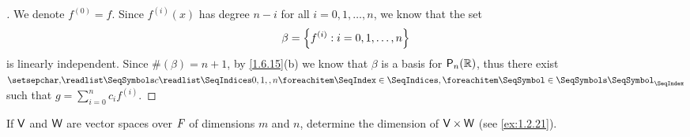 \begin{proof}[]
  We denote \(f^{(0)} = f\).
  Since \(f^{(i)}(x)\) has degree \(n - i\) for all \(i = 0, 1, \dots, n\), we know that the set
  \[
    \beta = \left\lbrace f^{(i)} : i = 0, 1, \dots, n\right\rbrace
  \]
  is linearly independent.
  Since \(\#(\beta) = n + 1\), by \cref{1.6.15}(b) we know that \(\beta\) is a basis for \(\ps[n]{\R}\), thus there exist \(\seq{c}{0,1,,n}\) such that \(g = \sum_{i = 0}^n c_i f^{(i)}\).
\end{proof}

\begin{ex}\label{ex:1.6.25}
  If \(\mathsf{V}\) and \(\mathsf{W}\) are vector spaces over \(\mathit{F}\) of dimensions \(m\) and \(n\), determine the dimension of \(\mathsf{V} \times \mathsf{W}\) (see \cref{ex:1.2.21}).
\end{ex}

